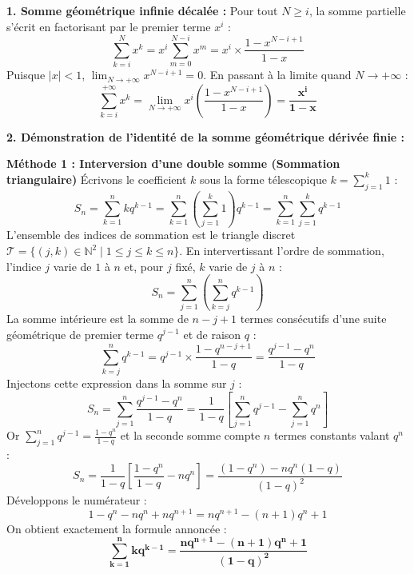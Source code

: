 \documentclass[11pt,a4paper]{article}
\newcommand{\N}{\mathbb{N}}
\begin{document}
\begin{correctionbox}
\textbf{1. Somme géométrique infinie décalée :}
Pour tout $N \ge i$, la somme partielle s'écrit en factorisant par le premier terme $x^i$ :
\[
\sum_{k=i}^N x^k = x^i \sum_{m=0}^{N-i} x^m = x^i \times \frac{1 - x^{N-i+1}}{1 - x}
\]
Puisque $|x| < 1$, $\lim_{N \to +\infty} x^{N-i+1} = 0$. En passant à la limite quand $N \to +\infty$ :
\[
\sum_{k=i}^{+\infty} x^k = \lim_{N \to +\infty} x^i \left(\frac{1 - x^{N-i+1}}{1 - x}\right) = \mathbf{\frac{x^i}{1 - x}}
\]

\textbf{2. Démonstration de l'identité de la somme géométrique dérivée finie :}

\textbf{Méthode 1 : Interversion d'une double somme (Sommation triangulaire)}
Écrivons le coefficient $k$ sous la forme télescopique $k = \sum_{j=1}^k 1$ :
\[
S_n = \sum_{k=1}^n k q^{k-1} = \sum_{k=1}^n \left( \sum_{j=1}^k 1 \right) q^{k-1} = \sum_{k=1}^n \sum_{j=1}^k q^{k-1}
\]
L'ensemble des indices de sommation est le triangle discret $\mathcal{T} = \{ (j, k) \in \N^2 \mid 1 \le j \le k \le n \}$.
En intervertissant l'ordre de sommation, l'indice $j$ varie de $1$ à $n$ et, pour $j$ fixé, $k$ varie de $j$ à $n$ :
\[
S_n = \sum_{j=1}^n \left( \sum_{k=j}^n q^{k-1} \right)
\]
La somme intérieure est la somme de $n - j + 1$ termes consécutifs d'une suite géométrique de premier terme $q^{j-1}$ et de raison $q$ :
\[
\sum_{k=j}^n q^{k-1} = q^{j-1} \times \frac{1 - q^{n-j+1}}{1 - q} = \frac{q^{j-1} - q^n}{1 - q}
\]
Injectons cette expression dans la somme sur $j$ :
\[
S_n = \sum_{j=1}^n \frac{q^{j-1} - q^n}{1 - q} = \frac{1}{1 - q} \left[ \sum_{j=1}^n q^{j-1} - \sum_{j=1}^n q^n \right]
\]
Or $\sum_{j=1}^n q^{j-1} = \frac{1 - q^n}{1 - q}$ et la seconde somme compte $n$ termes constants valant $q^n$ :
\[
S_n = \frac{1}{1 - q} \left[ \frac{1 - q^n}{1 - q} - n q^n \right] = \frac{(1 - q^n) - n q^n(1 - q)}{(1 - q)^2}
\]
Développons le numérateur :
\[
1 - q^n - n q^n + n q^{n+1} = n q^{n+1} - (n+1) q^n + 1
\]
On obtient exactement la formule annoncée :
\[
\mathbf{\sum_{k=1}^n k q^{k-1} = \frac{n q^{n+1} - (n+1) q^n + 1}{(1 - q)^2}}
\]


\end{correctionbox}
\end{document}

